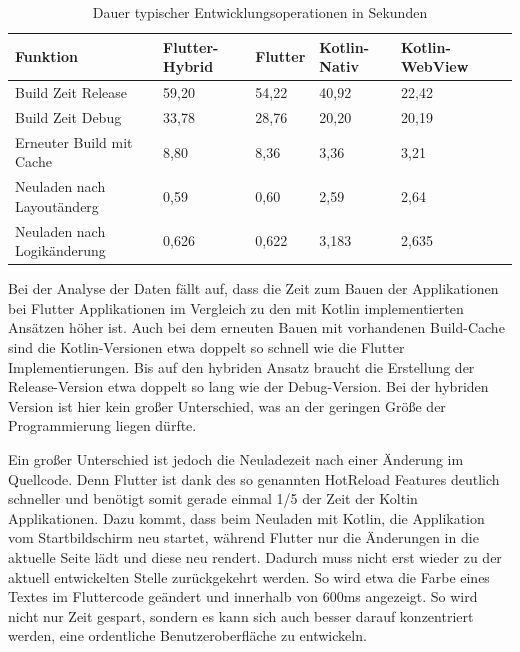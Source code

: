 \begin{table}
\centering
\caption{Dauer typischer Entwicklungsoperationen in Sekunden}
\begin{tabular}{ |p{4cm}||p{3cm}|p{2cm}|p{2cm}|p{3cm}|p{3cm}| }
 \hline
 Funktion & Flutter-Hybrid & Flutter & Kotlin-Nativ & Kotlin-WebView \\
 \hline
 Build Zeit Release       &   59,20&   54,22& 40,92& 22,42\\
  \hline
 Build Zeit Debug  & 33,78& 28,76& 20,20& 20,19\\
  \hline
 Erneuter Build mit Cache & 8,80& 8,36& 3,36& 3,21\\
  \hline
 Neuladen nach Layoutänderg & 0,59& 0,60& 2,59& 2,64\\
  \hline
 Neuladen nach Logikänderung & 0,626& 0,622& 3,183& 2,635\\
  \hline
\end{tabular}
\label{tab:evaluations_build_time}
\end{table}

Bei der Analyse der Daten fällt auf, dass die Zeit zum Bauen der Applikationen  bei Flutter Applikationen im Vergleich zu den mit Kotlin implementierten Ansätzen höher ist. 
Auch bei dem erneuten Bauen mit vorhandenen Build-Cache sind die Kotlin-Versionen etwa doppelt so schnell wie die Flutter Implementierungen.
Bis auf den hybriden Ansatz braucht die Erstellung der Release-Version etwa doppelt so lang wie der Debug-Version. 
Bei der hybriden Version ist hier kein großer Unterschied, was an der geringen Größe der Programmierung liegen dürfte.

Ein großer Unterschied ist jedoch die Neuladezeit nach einer Änderung im Quellcode. Denn Flutter ist dank des so genannten HotReload Features deutlich schneller und benötigt somit gerade einmal 1/5 der Zeit der Koltin Applikationen. Dazu kommt, dass beim Neuladen mit Kotlin, die Applikation vom Startbildschirm neu startet, während Flutter nur die Änderungen in die aktuelle Seite lädt und diese neu rendert. Dadurch muss nicht erst wieder zu der aktuell entwickelten Stelle zurückgekehrt werden. So wird etwa die Farbe eines Textes im Fluttercode geändert und innerhalb von 600ms angezeigt. So wird nicht nur Zeit gespart, sondern es kann sich auch besser darauf konzentriert werden, eine ordentliche Benutzeroberfläche zu entwickeln.

